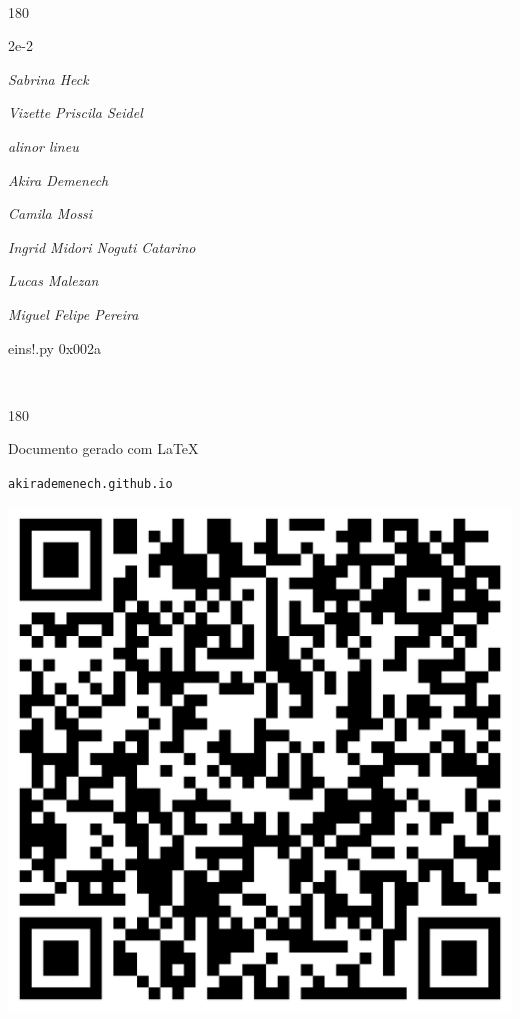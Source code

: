 \documentclass[12pt]{article}
\begin{document}
	\ 
	\vfill
	\begin{turn}{180}	
		\begin{minipage}{\textwidth}
		  	\ttfamily %
			\centering
			{\Huge 2e-2}
		  
			\hfill
		  
			

\textit{\small Sabrina Heck}

\textit{\small Vizette Priscila Seidel}

\textit{\small alinor lineu}

\textit{\small Akira Demenech}

\textit{\small Camila Mossi}

\textit{\small Ingrid Midori Noguti Catarino}

\textit{\small Lucas Malezan}

\textit{\small Miguel Felipe Pereira}

\bigskip

eins!.py
0x002a


		\end{minipage}	
	\end{turn}
	\vfill
	\

\pagebreak

	\begin{turn}{180}	
		\begin{minipage}{\textwidth}		  
		  Documento gerado com \LaTeX			
		  
		  \texttt{akirademenech.github.io}

		  \includegraphics[height=0.3\textheight]{2e-2.pdf}

		\end{minipage}	
	\end{turn}  
		  
\end{document}
